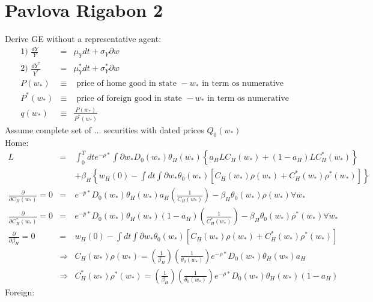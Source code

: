 \documentclass[]{article}
\begin{document}
\section*{Pavlova Rigabon 2}
Derive GE without a representative agent:
\begin{eqnarray*}
\mbox{1) } \frac{dY}{Y} &=& \mu _Y dt + \sigma _Y \partial w\\
\mbox{2) } \frac{dY^*}{Y^*} &=& \mu _Y^* dt + \sigma _Y^* \partial w\\
P(w_*) &\equiv & \mbox{ price of home good in state } - w_* \mbox{ in term os numerative }\\
P^*(w_*) &\equiv & \mbox{ price of foreign good in state } - w_* \mbox{ in term os numerative }\\
q(w_*) &\equiv & \frac{P(w_*)}{P^*(w_*)}
\end{eqnarray*}
Assume complete set of ... securities with dated prices $ Q_0(w_*)$\\
Home: 
\begin{eqnarray*}
L &=& \int_0^T dt e^{-\rho *} \int \partial w_* D_0(w_*) \theta _H (w_*) \left\{ a_H LC_H(w_*) + (1-a_H) L C_H^*(w_*)\right\}\\
&& + \beta _H \left\{ w_H(0) - \int dt \int \partial w_* \theta _0(w_*) \left[C_H(w_*) \rho(w_*) + C_H^*(w_*)\rho ^*(w_*)\right]\right\}\\
\frac{\partial}{\partial C_H(w_*)} = 0 &=& e^{-p*} D_0(w_*) \theta _H(w_*) a_H \left(\frac{1}{C_H(w_*)}\right) - \beta _H \theta _0(w_*) \rho (w_*) \forall w_*\\
\frac{\partial}{\partial C_H^*(w_*)} = 0 &=& e^{-p*} D_0(w_*) \theta _H(w_*) (1-a_H) \left(\frac{1}{C_H^*(w_*)}\right) - \beta _H \theta _0(w_*) \rho ^* (w_*) \forall w_*\\
\frac{\partial}{\partial \beta _H} = 0 &=& w_H(0) - \int dt \int \partial w_* \theta _0(w_*) \left[C_H(w_*) \rho (w_*) + C_H^* (w_*) \rho ^*(w_*)\right]\\
&\Rightarrow & C_H(w_*) \rho (w_*) = \left(\frac{1}{\beta _H}\right) \left(\frac{1}{\theta _0(w_*)}\right) e^{-\rho *} D_0(w_*) \theta _H(w_*) a_H\\
& \Rightarrow & C_H^*(w_*) \rho ^*(w_*) = \left(\frac{1}{\beta _H}\right) \left(\frac{1}{\theta _0(w_*)}\right) e^{-\rho *} D_0(w_*) \theta _H(w_*) (1-a_H)
\end{eqnarray*}
Foreign: 
\end{document}
